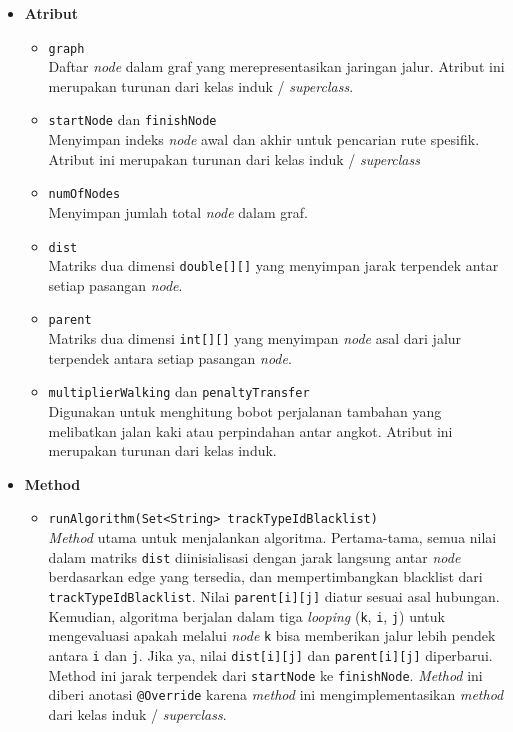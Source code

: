 \begin{itemize}
    \item \textbf{Atribut}
    \begin{itemize}
        \item \texttt{graph}
        \\ Daftar \textit{node} dalam graf yang merepresentasikan jaringan jalur. Atribut ini merupakan turunan dari kelas induk / \textit{superclass}.
        \item \texttt{startNode} dan \texttt{finishNode}
        \\ Menyimpan indeks \textit{node} awal dan akhir untuk pencarian rute spesifik. Atribut ini merupakan turunan dari kelas induk / \textit{superclass}
        \item \texttt{numOfNodes}
        \\ Menyimpan jumlah total \textit{node} dalam graf.
        \item \texttt{dist}
        \\ Matriks dua dimensi \texttt{double[][]} yang menyimpan jarak terpendek antar setiap pasangan \textit{node}.
        \item \texttt{parent}
        \\ Matriks dua dimensi \texttt{int[][]} yang menyimpan \textit{node} asal dari jalur terpendek antara setiap pasangan \textit{node}.
        \item \texttt{multiplierWalking} dan \texttt{penaltyTransfer}
        \\ Digunakan untuk menghitung bobot perjalanan tambahan yang melibatkan jalan kaki atau perpindahan antar angkot. Atribut ini merupakan turunan dari kelas induk.
    \end{itemize}

    \item \textbf{Method}
    \begin{itemize}
        \item \texttt{runAlgorithm(Set<String> trackTypeIdBlacklist)}
        \\ \textit{Method} utama untuk menjalankan algoritma. Pertama-tama, semua nilai dalam matriks \texttt{dist} diinisialisasi dengan jarak langsung antar \textit{node} berdasarkan edge yang tersedia, dan mempertimbangkan blacklist dari \texttt{trackTypeIdBlacklist}. Nilai \texttt{parent[i][j]} diatur sesuai asal hubungan. Kemudian, algoritma berjalan dalam tiga \textit{looping} (\texttt{k}, \texttt{i}, \texttt{j}) untuk mengevaluasi apakah melalui \textit{node} \texttt{k} bisa memberikan jalur lebih pendek antara \texttt{i} dan \texttt{j}. Jika ya, nilai \texttt{dist[i][j]} dan \texttt{parent[i][j]} diperbarui. Method ini jarak terpendek dari \texttt{startNode} ke \texttt{finishNode}. \textit{Method} ini diberi anotasi \texttt{@Override} karena \textit{method} ini mengimplementasikan \textit{method} dari kelas induk / \textit{superclass}.


\end{itemize}
\end{itemize}

